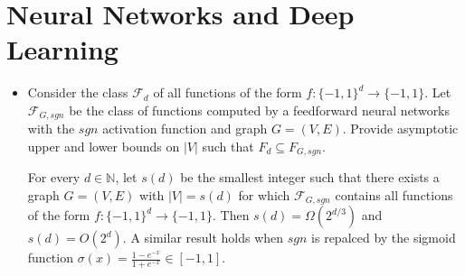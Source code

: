 \newpage
\section{Neural Networks and Deep Learning}

\begin{itemize}

    \item Consider the class $\mathcal{F}_d$ of all functions of the form $f : \{-1, 1\}^d \rightarrow \{-1, 1\}$. Let $\mathcal{F}_{G,sgn}$ be the class of functions computed by a feedforward neural networks with the $sgn$ activation function and graph $G = (V, E)$. Provide asymptotic upper and lower bounds on $|V|$ such that $F_d \subseteq F_{G,sgn}$.  

        For every $d \in \mathbb{N}$, let $s(d)$ be the smallest integer such that there exists a graph $G = (V, E)$ with $|V| = s(d)$ for which $\mathcal{F}_{G, sgn}$ contains all functions of the form $f : \{-1, 1\}^d \rightarrow \{-1, 1\}$. Then $s(d) = \Omega(2^{d/3})$ and $s(d) = O(2^d)$. A similar result holds when $sgn$ is repalced by the sigmoid function $\sigma(x) = \frac{1 - e^{-x}}{1 + e^{-x}} \in [-1,1]$.
\end{itemize}
